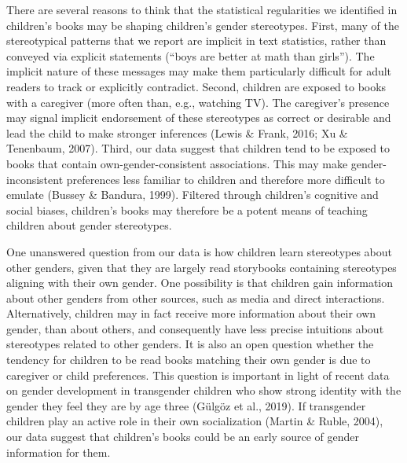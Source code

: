 \documentclass[
  english,
  ,man,floatsintext]{apa6}
\begin{document}
There are several reasons to think that the statistical regularities we identified in children's books may be shaping children's gender stereotypes. First, many of the stereotypical patterns that we report are implicit in text statistics, rather than conveyed via explicit statements (\enquote{boys are better at math than girls}). The implicit nature of these messages may make them particularly difficult for adult readers to track or explicitly contradict. Second, children are exposed to books with a caregiver (more often than, e.g., watching TV). The caregiver's presence may signal implicit endorsement of these stereotypes as correct or desirable and lead the child to make stronger inferences (Lewis \& Frank, 2016; Xu \& Tenenbaum, 2007). Third, our data suggest that children tend to be exposed to books that contain own-gender-consistent associations. This may make gender-inconsistent preferences less familiar to children and therefore more difficult to emulate (Bussey \& Bandura, 1999). Filtered through children's cognitive and social biases, children's books may therefore be a potent means of teaching children about gender stereotypes.

One unanswered question from our data is how children learn stereotypes about other genders, given that they are largely read storybooks containing stereotypes aligning with their own gender. One possibility is that children gain information about other genders from other sources, such as media and direct interactions. Alternatively, children may in fact receive more information about their own gender, than about others, and consequently have less precise intuitions about stereotypes related to other genders. It is also an open question whether the tendency for children to be read books matching their own gender is due to caregiver or child preferences. This question is important in light of recent data on gender development in transgender children who show strong identity with the gender they feel they are by age three (Gülgöz et al., 2019). If transgender children play an active role in their own socialization (Martin \& Ruble, 2004), our data suggest that children's books could be an early source of gender information for them.
\end{document}
